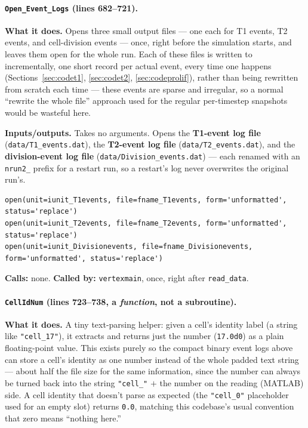 \documentclass[11pt]{article}
\begin{document}
\paragraph{\texttt{Open\_Event\_Logs} (lines 682--721).}
\textbf{What it does.} Opens three small output files --- one each for T1 events, T2
events, and cell-division events --- once, right before the simulation starts, and
leaves them open for the whole run. Each of these files is written to incrementally,
one short record per actual event, every time one happens (Sections~\ref{sec:codet1},
\ref{sec:codet2}, \ref{sec:codeprolif}), rather than being rewritten from scratch each
time --- these events are sparse and irregular, so a normal ``rewrite the whole file''
approach used for the regular per-timestep snapshots would be wasteful here.

\textbf{Inputs/outputs.} Takes no arguments. Opens the \textbf{T1-event log file}
(\texttt{data/T1\_events.dat}), the \textbf{T2-event log file}
(\texttt{data/T2\_events.dat}), and the \textbf{division-event log file}
(\texttt{data/Division\_events.dat}) --- each renamed with an \texttt{nrun2\_} prefix for
a restart run, so a restart's log never overwrites the original run's.

\begin{lstlisting}[caption={Opening the three event logs, once, before the timestep loop begins.}]
open(unit=iunit_T1events, file=fname_T1events, form='unformatted', status='replace')
open(unit=iunit_T2events, file=fname_T2events, form='unformatted', status='replace')
open(unit=iunit_Divisionevents, file=fname_Divisionevents, form='unformatted', status='replace')
\end{lstlisting}

\textbf{Calls:} none. \textbf{Called by:} \texttt{vertexmain}, once, right after
\texttt{read\_data}.

\paragraph{\texttt{CellIdNum} (lines 723--738, a \emph{function}, not a subroutine).}
\textbf{What it does.} A tiny text-parsing helper: given a cell's identity label (a
string like \texttt{"cell\_17"}), it extracts and returns just the number
(\texttt{17.0d0}) as a plain floating-point value. This exists purely so the compact
binary event logs above can store a cell's identity as one number instead of the whole
padded text string --- about half the file size for the same information, since the
number can always be turned back into the string \texttt{"cell\_"} $+$ the number on
the reading (MATLAB) side. A cell identity that doesn't parse as expected (the
\texttt{"cell\_0"} placeholder used for an empty slot) returns \texttt{0.0}, matching
this codebase's usual convention that zero means ``nothing here.''
\end{document}
